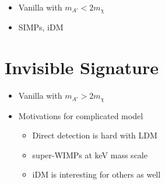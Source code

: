 \begin{itemize}
    \item Vanilla with $m_{A'} < 2m_\chi$
    \item SIMPs, iDM
\end{itemize}

\section{Invisible Signature}
\begin{itemize}
    \item Vanilla with $m_{A'} > 2m_\chi$
\end{itemize}

\begin{itemize}
    \item Motivations for complicated model
          \begin{itemize}
              \item Direct detection is hard with LDM \cite{ldmconstraints-2019}
              \item super-WIMPs at keV mass scale \cite{superwimps-2008}
              \item iDM is interesting for others as well \cite{darkseaquest-2018}
          \end{itemize}
\end{itemize}


